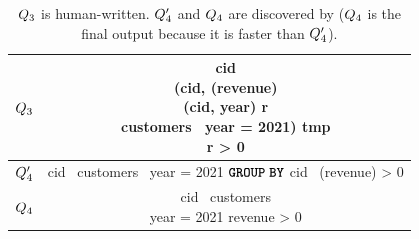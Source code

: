 \begin{table}[!t]
\footnotesize 
\caption{$Q_3$ is human-written. $Q'_4$ and $Q_4$ are discovered by \slabcity ($Q_4$ is the final output because it is faster than $Q'_4$).}
\vspace{-5pt}
\begin{tabular}{|c|c|}
\hline
 $Q_3$

 & 
 
 \makecell[l]{\sqlselectcolor cid\\
 \sqlfromcolor (\sqlselectcolor cid, \sqlsumcolor(revenue) \\ 
 \hspace{7.2em} \sqlovercolor (\sqlpartitionbycolor cid, year) \sqlascolor r \\
             \hspace{2.3em} \sqlfromcolor customers \  \sqlwherecolor year = 2021) \sqlascolor tmp \\
               \sqlwherecolor r > 0
              }  
\\

\hline

$Q_4'$

&

 \makecell[l]{ \sqlselectcolor cid \ \sqlfromcolor customers \ \\ \sqlwherecolor year = 2021 \\ 
                ${\color{black}{{\textbf{\texttt{GROUP}}\;\textbf{\texttt{BY}}}}}$ cid \  \sqlhavingcolor \sqlsumcolor(revenue) > 0}
 
 \\

 
\hline
$Q_4$
&
 \makecell[l]{
 \sqlselectcolor cid \ 
 \sqlfromcolor customers \\ 
 \sqlwherecolor year = 2021 \sqlandcolor revenue > 0
              }  
  \\
  
 \hline
\end{tabular}
\vspace{-8pt}

\label{slab:tab:Q3-Q4} 
\end{table}



